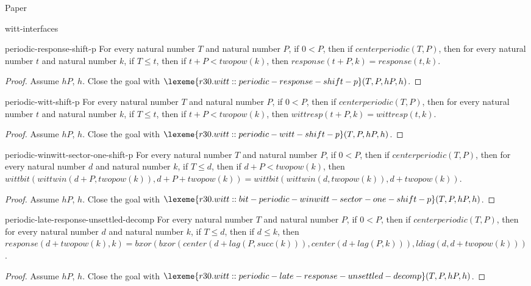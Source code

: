 \begin{lexlean}{Paper}
\begin{section}{witt-interfaces}
  \begin{theorem}{periodic-response-shift-p}
  For every natural number \(T\) and natural number \(P\), if \(0 < P\), then if \(centerperiodic(T, P)\), then for every natural number \(t\) and natural number \(k\), if \(T ≤ t\), then if \(t + P < twopow(k)\), then \(response(t + P, k) = response(t, k)\).
  \begin{proof}
  Assume \(hP\), \(h\).
  Close the goal with \(\lexeme{r30.witt::periodic-response-shift-p}(T, P, hP, h)\).
  \end{proof}
  \end{theorem}

  \begin{theorem}{periodic-witt-shift-p}
  For every natural number \(T\) and natural number \(P\), if \(0 < P\), then if \(centerperiodic(T, P)\), then for every natural number \(t\) and natural number \(k\), if \(T ≤ t\), then if \(t + P < twopow(k)\), then \(wittresp(t + P, k) = wittresp(t, k)\).
  \begin{proof}
  Assume \(hP\), \(h\).
  Close the goal with \(\lexeme{r30.witt::periodic-witt-shift-p}(T, P, hP, h)\).
  \end{proof}
  \end{theorem}

  \begin{theorem}{periodic-winwitt-sector-one-shift-p}
  For every natural number \(T\) and natural number \(P\), if \(0 < P\), then if \(centerperiodic(T, P)\), then for every natural number \(d\) and natural number \(k\), if \(T ≤ d\), then if \(d + P < twopow(k)\), then \(wittbit(wittwin(d + P, twopow(k)), d + P + twopow(k)) = wittbit(wittwin(d, twopow(k)), d + twopow(k))\).
  \begin{proof}
  Assume \(hP\), \(h\).
  Close the goal with \(\lexeme{r30.witt::bit-periodic-winwitt-sector-one-shift-p}(T, P, hP, h)\).
  \end{proof}
  \end{theorem}

  \begin{theorem}{periodic-late-response-unsettled-decomp}
  For every natural number \(T\) and natural number \(P\), if \(0 < P\), then if \(centerperiodic(T, P)\), then for every natural number \(d\) and natural number \(k\), if \(T ≤ d\), then if \(d ≤ k\), then \(response(d + twopow(k), k) = bxor(bxor(center(d + lag(P, succ(k))), center(d + lag(P, k))), ldiag(d, d + twopow(k)))\).
  \begin{proof}
  Assume \(hP\), \(h\).
  Close the goal with \(\lexeme{r30.witt::periodic-late-response-unsettled-decomp}(T, P, hP, h)\).
  \end{proof}
  \end{theorem}


\end{section}
\end{lexlean}
